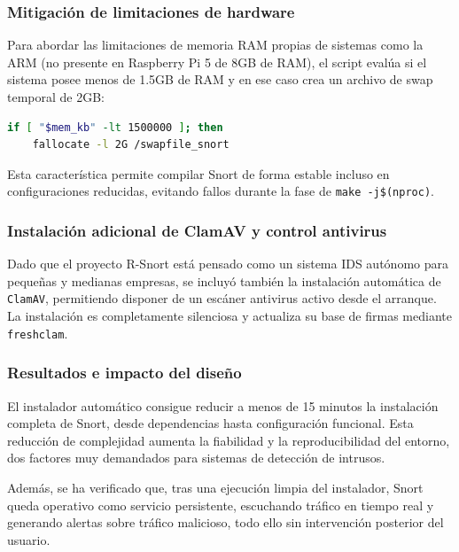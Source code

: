 \documentclass[11pt,a4paper,twoside]{report}
\begin{document}
\subsubsection{Mitigación de limitaciones de hardware}

Para abordar las limitaciones de memoria RAM propias de sistemas como la ARM (no presente en Raspberry Pi 5 de 8GB de RAM), el script evalúa si el sistema posee menos de 1.5GB de RAM y en ese caso crea un archivo de swap temporal de 2GB:

\begin{lstlisting}[language=bash]
	if [ "$mem_kb" -lt 1500000 ]; then
	fallocate -l 2G /swapfile_snort
\end{lstlisting}

Esta característica permite compilar Snort de forma estable incluso en configuraciones reducidas, evitando fallos durante la fase de \texttt{make -j\$(nproc)}.

\subsubsection{Instalación adicional de ClamAV y control antivirus}

Dado que el proyecto R-Snort está pensado como un sistema IDS autónomo para pequeñas y medianas empresas, se incluyó también la instalación automática de \texttt{ClamAV}, permitiendo disponer de un escáner antivirus activo desde el arranque. La instalación es completamente silenciosa y actualiza su base de firmas mediante \texttt{freshclam}.

\subsubsection{Resultados e impacto del diseño}

El instalador automático consigue reducir a menos de 15 minutos la instalación completa de Snort, desde dependencias hasta configuración funcional. Esta reducción de complejidad aumenta la fiabilidad y la reproducibilidad del entorno, dos factores muy demandados para sistemas de detección de intrusos.\newline

Además, se ha verificado que, tras una ejecución limpia del instalador, Snort queda operativo como servicio persistente, escuchando tráfico en tiempo real y generando alertas sobre tráfico malicioso, todo ello sin intervención posterior del usuario.

\pagebreak
\end{document}
